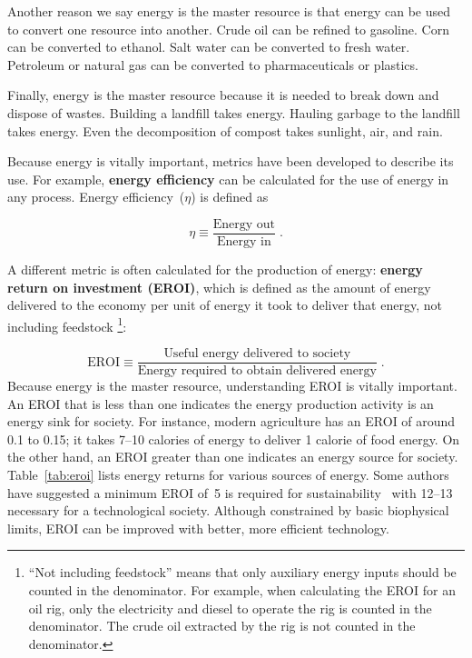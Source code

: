 \documentclass{article}\usepackage[]{graphicx}\usepackage[table]{xcolor}
\begin{document}
Another reason we say energy is the master resource
is that energy can be used to convert one resource into another.
Crude oil can be refined to gasoline.
Corn can be converted to ethanol.
Salt water can be converted to fresh water.
Petroleum or natural gas can be converted to pharmaceuticals
or plastics.

Finally, energy is the master resource because
it is needed to break down and dispose of wastes.
Building a landfill takes energy.
Hauling garbage to the landfill takes energy.
Even the decomposition of compost takes sunlight, air, and rain.

Because energy is vitally important,
metrics have been developed to describe its use.
For example, \textbf{energy efficiency} can be calculated
for the use of energy in any process.
Energy efficiency~($\eta$) is defined as

\begin{equation} \label{eq:energy_efficiency_def}
  \eta \equiv \frac{\text{Energy out}}{\text{Energy in}} \; .
\end{equation}

A different metric is often calculated for the production of energy:
\textbf{energy return on investment (EROI)},
which is defined as the amount of energy delivered to the economy
per unit of energy it took to deliver that energy,
not including feedstock
\footnote{
  ``Not including feedstock'' means that only auxiliary energy inputs should be counted
  in the denominator.
  For example, when calculating the EROI for an oil rig,
  only the electricity and diesel to operate the rig is counted in the denominator.
  The crude oil extracted by the rig is not counted in the denominator.
}:

\begin{equation}\label{eroi}
   \text{EROI} \equiv \frac{\text{Useful energy delivered to society}}
                           {\text{Energy required to obtain delivered energy}} \; .
\end{equation}
%
Because energy is the master resource,
understanding EROI is vitally important.
An EROI
that is less than one indicates the energy production activity is an energy sink for society.
For instance, modern agriculture has an EROI of around 0.1 to 0.15;
it takes 7--10 calories of energy to deliver 1 calorie of food energy.
On the other hand, an EROI greater than one indicates 
an energy source for society.
Table~\ref{tab:eroi} lists energy returns
for various sources of energy.
Some authors have suggested a minimum EROI
of~5 is required for sustainability~\cite{Ferruccio2016}
with 12--13 necessary for a technological society.
Although constrained by basic biophysical limits, 
EROI can be improved with better,
more efficient technology.
\end{document}
